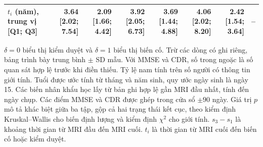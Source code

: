 \begin{landscape}
\begin{table}[p]
\begin{tabular}{@{}lrrrrrrr@{}}
$t_i$ (năm), trung vị [Q1; Q3] & 3.64 [2.02; 7.54] & 2.09 [1.66; 4.42] & 3.92 [2.05; 6.73] & 3.69 [1.44; 4.88] & 4.06 [2.02; 8.20] & 2.42 [1.54; 3.64] & -- \\
\bottomrule
\end{tabular}
\par\vspace{6pt}
\begin{minipage}{0.96\linewidth}\small
$\delta=0$ biểu thị kiểm duyệt và $\delta=1$ biểu thị biến cố. Trừ các dòng có ghi riêng, bảng trình bày trung bình $\pm$ SD mẫu. Với MMSE và CDR, số trong ngoặc là số quan sát hợp lệ trước khi điền thiếu. Tỷ lệ nam tính trên số người có thông tin giới tính. Tuổi được ước tính từ tháng và năm sinh, quy ước ngày sinh là ngày 15. Các biến nhân khẩu học lấy từ bản ghi hợp lệ gần MRI đầu nhất, tính đến ngày chụp. Các điểm MMSE và CDR được ghép trong cửa sổ $\pm90$ ngày. Giá trị $p$ mô tả khác biệt giữa ba tập, gộp cả hai trạng thái kết cục, theo kiểm định Kruskal--Wallis cho biến định lượng và kiểm định $\chi^2$ cho giới tính. $s_3-s_1$ là khoảng thời gian từ MRI đầu đến MRI cuối. $t_i$ là thời gian từ MRI cuối đến biến cố hoặc kiểm duyệt.
\end{minipage}
\end{table}
\end{landscape}
